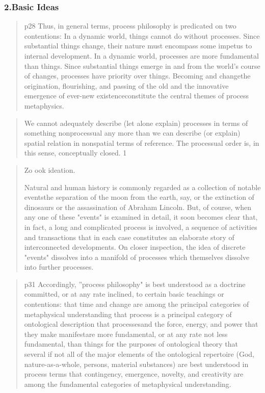 \documentclass[a4paper]{Thesis}
\begin{document}
\subsubsection{2.Basic Ideas}
\begin{quotation}
	p28
	Thus, in general
	terms, process philosophy is predicated on two contentions:
	In a dynamic world, things cannot do without processes. Since
	substantial things change, their nature must encompass some impetus to
	internal development.
	In a dynamic world, processes are more fundamental than things. Since
	substantial things emerge in and from the world's course of changes,
	processes have priority over things.
	Becoming and changethe origination, flourishing, and passing of the old and the
	innovative emergence of ever-new existenceconstitute the central themes of process
	metaphysics.
\end{quotation}

\begin{quotation}
	We cannot
	adequately describe (let alone explain) processes in terms of something nonprocessual
	any more than we can describe (or explain) spatial relation in nonspatial terms of
	reference. The processual order is, in this sense, conceptually closed. 1
\end{quotation}

\begin{quotation}
	Zo ook ideation.
	
	Natural and human history is
	commonly regarded as a collection of notable eventsthe separation of the moon from the
	earth, say, or the extinction of dinosaurs or the assassination of Abraham Lincoln. But, of
	course, when any one of these "events" is examined in detail, it soon becomes clear that,
	in fact, a long and complicated process is involved, a sequence of activities and
	transactions that in each case constitutes an elaborate story of interconnected
	developments. On closer inspection, the idea of discrete "events" dissolves into a
	manifold of processes which themselves dissolve into further processes.	
\end{quotation}

\begin{quotation}
	p31
	Accordingly, ''process philosophy" is best understood as a doctrine committed, or at any
	rate inclined, to certain basic teachings or contentions:
	that time and change are among the principal categories of metaphysical
	understanding
	that process is a principal category of ontological description
	that processesand the force, energy, and power that they make
	manifestare more fundamental, or at any rate not less fundamental, than
	things for the purposes of ontological theory
	that several if not all of the major elements of the ontological repertoire
	(God, nature-as-a-whole, persons, material substances) are best
	understood in process terms
	that contingency, emergence, novelty, and creativity are among the
	fundamental categories of metaphysical understanding.	
\end{quotation}
\end{document}
